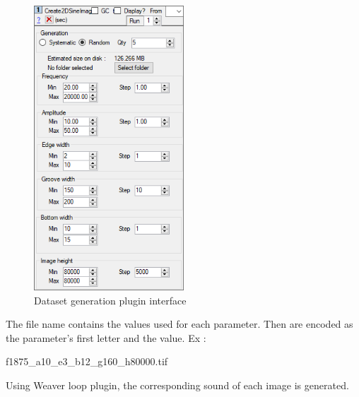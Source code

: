 \documentclass[12pt, twoside]{article}
\begin{document}
\begin{figure}[H]
	\centering
	\includegraphics[width=0.5\textwidth]{../images/datasetplugin.png}
	\caption{Dataset generation plugin interface}
	\label{dsplugin}
\end{figure}

The file name contains the values used for each parameter. Then are encoded as the parameter's first letter and the value. Ex :

f1875\_a10\_e3\_b12\_g160\_h80000.tif

Using Weaver loop plugin, the corresponding sound of each image is generated.
\end{document}
